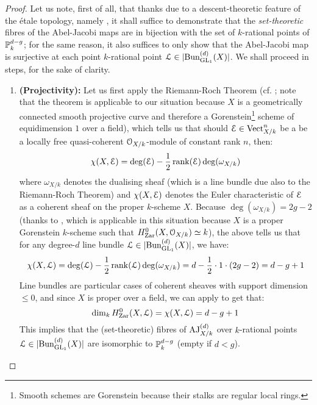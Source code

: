             \begin{proof}
                Let us note, first of all, that thanks due to a descent-theoretic feature of the \'etale topology, namely \cite[\href{https://stacks.math.columbia.edu/tag/024V}{Tag 024V}]{stacks}, it shall suffice to demonstrate that the \textit{set-theoretic} fibres of the Abel-Jacobi maps are in bijection with the set of $k$-rational points of $\P_k^{d - g}$; for the same reason, it also suffices to only show that the Abel-Jacobi map is surjective at each point $k$-rational point $\calL \in |\Bun_{\GL_1}^{(d)}(X)|$. We shall proceed in steps, for the sake of clarity.
                    \begin{enumerate}
                        \item \textbf{(Projectivity):} Let us first apply the Riemann-Roch Theorem (cf. \cite[\href{https://stacks.math.columbia.edu/tag/0BS6}{Tag 0BS6}]{stacks}; note that the theorem is applicable to our situation because $X$ is a geometrically connected smooth projective curve and therefore a Gorenstein\footnote{Smooth schemes are Gorenstein because their stalks are regular local rings.} scheme of equidimension $1$ over a field), which tells us that should $\E \in \Vect_{X/k}^n$ be a be a locally free quasi-coherent $\calO_{X/k}$-module of constant rank $n$, then:
                            $$\chi(X, \E) = \deg(\E) - \frac12\rank(\E) \deg(\omega_{X/k})$$
                        where $\omega_{X/k}$ denotes the dualising sheaf (which is a line bundle due also to the Riemann-Roch Theorem) and $\chi(X, \E)$ denotes the Euler characteristic of $\E$ as a coherent sheaf on the proper $k$-scheme $X$. Because $\deg(\omega_{X/k}) = 2g - 2$ (thanks to \cite[\href{https://stacks.math.columbia.edu/tag/0C19}{Tag 0C19}]{stacks}, which is applicable in this situation because $X$ is a proper Gorenstein $k$-scheme such that $H^0_{\Zar}(X, \calO_{X/k}) \cong k$), the above tells us that for any degree-$d$ line bundle $\calL \in |\Bun_{\GL_1}^{(d)}(X)|$, we have:
                            $$\chi(X, \calL) = \deg(\calL) - \frac12 \rank(\calL) \deg(\omega_{X/k}) = d - \frac12 \cdot 1 \cdot (2g - 2) = d - g + 1$$
                        Line bundles are particular cases of coherent sheaves with support dimension $\leq 0$, and since $X$ is proper over a field, we can apply \cite[\href{https://stacks.math.columbia.edu/tag/0AYT}{Tag 0AYT}]{stacks} to get that:
                            $$\dim_k H^0_{\Zar}(X, \calL) = \chi(X, \calL) = d - g + 1$$
                        This implies that the (set-theoretic) fibres of $\AJ_{X/k}^{(d)}$ over $k$-rational points $\calL \in |\Bun_{\GL_1}^{(d)}(X)|$ are isomorphic to $\P^{d - g}_k$ (empty if $d < g$).

\end{enumerate}
\end{proof}
